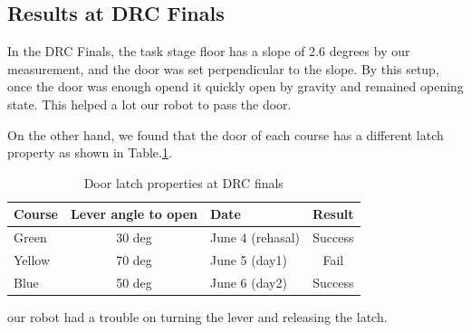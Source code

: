 
\subsection{Results at DRC Finals}
%
In the DRC Finals, the task stage floor has a slope of 2.6 degrees by 
our measurement, and the door was set perpendicular to the slope. 
By this setup, once the door was enough opend it quickly open by gravity
and remained opening state. This helped a lot our robot to pass the door.

On the other hand, we found that the door of each course has a different latch property
as shown in Table.\ref{tbl:door_latch}.

%
\begin{table}[htb]
\caption{Door latch properties at DRC finals} \label{tbl:door_latch}
\begin{tabular}{lclc}
\hline
Course & Lever angle to open & Date & Result  \\ 
\hline
Green & 30 deg & June 4 (rehasal) & Success  \\
Yellow & 70 deg & June 5 (day1) & Fail \\
Blue &  50 deg & June 6 (day2)  & Success \\
\hline
\end{tabular}
\end{table}

our robot had a trouble on turning the lever and releasing the latch.